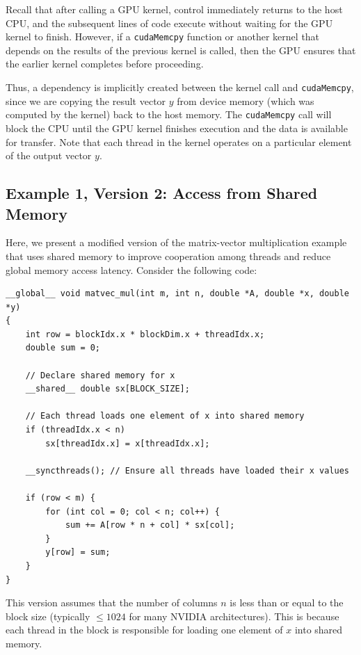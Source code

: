 \documentclass[12pt]{book}
\begin{document}
Recall that after calling a GPU kernel, control immediately returns to the host CPU, and the subsequent lines of code execute without waiting for the GPU kernel to finish. However, if a \texttt{cudaMemcpy} function or another kernel that depends on the results of the previous kernel is called, then the GPU ensures that the earlier kernel completes before proceeding.

Thus, a dependency is implicitly created between the kernel call and \texttt{cudaMemcpy}, since we are copying the result vector $y$ from device memory (which was computed by the kernel) back to the host memory. The \texttt{cudaMemcpy} call will block the CPU until the GPU kernel finishes execution and the data is available for transfer. Note that each thread in the kernel operates on a particular element of the output vector $y$.

\subsection{Example 1, Version 2: Access from Shared Memory}

Here, we present a modified version of the matrix-vector multiplication example that uses shared memory to improve cooperation among threads and reduce global memory access latency. Consider the following code:

\begin{lstlisting}[style=cppstyle]
__global__ void matvec_mul(int m, int n, double *A, double *x, double *y)
{
    int row = blockIdx.x * blockDim.x + threadIdx.x;
    double sum = 0;

    // Declare shared memory for x
    __shared__ double sx[BLOCK_SIZE];

    // Each thread loads one element of x into shared memory
    if (threadIdx.x < n)
        sx[threadIdx.x] = x[threadIdx.x];

    __syncthreads(); // Ensure all threads have loaded their x values

    if (row < m) {
        for (int col = 0; col < n; col++) {
            sum += A[row * n + col] * sx[col];
        }
        y[row] = sum;
    }
}
\end{lstlisting}

\noindent
This version assumes that the number of columns $n$ is less than or equal to the block size (typically $\leq 1024$ for many NVIDIA architectures). This is because each thread in the block is responsible for loading one element of $x$ into shared memory.
\end{document}
